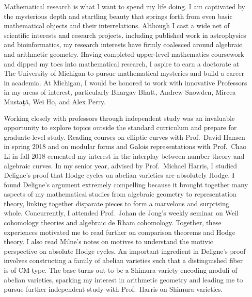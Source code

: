 \documentclass[11pt]{article}
\begin{document}
Mathematical research is what I want to spend my life doing. I am captivated by the mysterious depth and startling beauty that springs forth from even basic mathematical objects and their interrelations. Although I cast a wide net of scientific interests and research projects, including published work in astrophysics and bioinformatics, my research interests have firmly coalesced around algebraic and arithmetic geometry. Having completed upper-level mathematics coursework and dipped my toes into mathematical research, I aspire to earn a doctorate at The University of Michigan to pursue mathematical mysteries and build a career in academia. At Michigan, I would be honored to work with innovative Professors in my areas of interest, particularly Bhargav Bhatt, Andrew Snowden, Mircea Mustaţă, Wei Ho, and Alex Perry. 
\par
Working closely with professors through independent study was an invaluable opportunity to explore topics outside the standard curriculum and prepare for graduate-level study. 
Reading courses on elliptic curves with Prof.\ David Hansen in spring 2018 and on modular forms and Galois representations with Prof.\ Chao Li in fall 2018 cemented my interest in the interplay between number theory and algebraic curves. In my senior year, advised by Prof.\ Michael Harris, I studied Deligne's proof that Hodge cycles on abelian varieties are absolutely Hodge. I found Deligne's argument extremely compelling because it brought together many aspects of my mathematical studies from algebraic geometry to representation theory, linking together disparate pieces to form a marvelous and surprising whole. Concurrently, I attended Prof.\ Johan de Jong's weekly seminar on Weil cohomology theories and algebraic de Rham cohomology. Together, these experiences motivated me to read further on comparison theorems and Hodge theory. I also read Milne's notes on motives to understand the motivic perspective on absolute Hodge cycles. An important ingredient in Deligne's proof involves constructing a family of abelian varieties such that a distinguished fiber is of CM-type. The base turns out to be a Shimura variety encoding moduli of abelian varieties, sparking my interest in arithmetic geometry and leading me to pursue further independent study with Prof.\ Harris on Shimura varieties.
\par
\end{document}
